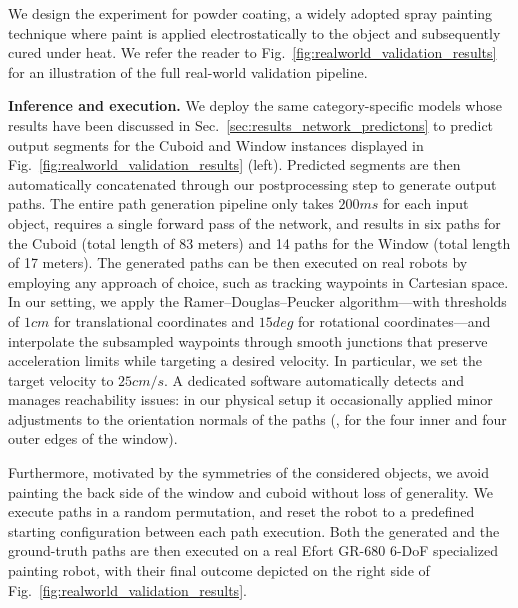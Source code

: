 We design the experiment for powder coating, a widely adopted spray painting technique where paint is applied electrostatically to the object and subsequently cured under heat.
We refer the reader to Fig.~\ref{fig:realworld_validation_results} for an illustration of the full real-world validation pipeline.

\noindent \textbf{Inference and execution.}
We deploy the same category-specific models whose results have been discussed in Sec.~\ref{sec:results_network_predictons}  
%
to predict output segments for the Cuboid and Window instances displayed in Fig.~\ref{fig:realworld_validation_results} (left).
Predicted segments are then automatically concatenated through our postprocessing step to generate output paths.
%
The entire path generation pipeline only takes $200ms$ for each input object, requires a single forward pass of the network, and results in six paths for the Cuboid (total length of 83 meters) and 14 paths for the Window (total length of 17 meters).
%
The generated paths can be then executed on real robots by employing any approach of choice, such as tracking waypoints in Cartesian space.
%
In our setting, we apply the Ramer–Douglas–Peucker algorithm---with thresholds of $1cm$ for translational coordinates and $15deg$ for rotational coordinates---and interpolate the subsampled waypoints through smooth junctions that preserve acceleration limits while targeting a desired velocity.
In particular, we set the target velocity to $25cm/s$.
%
A dedicated software automatically detects and manages reachability issues: in our physical setup it occasionally applied minor adjustments to the orientation normals of the paths (\eg, for the four inner and four outer edges of the window).

Furthermore, motivated by the symmetries of the considered objects, we avoid painting the back side of the window and cuboid without loss of generality.
We execute paths in a random permutation, and reset the robot to a predefined starting configuration between each path execution.
%
Both the generated and the ground-truth paths are then executed on a real
Efort GR-680 6-DoF specialized painting robot, with their final outcome depicted on the right side of Fig.~\ref{fig:realworld_validation_results}.


